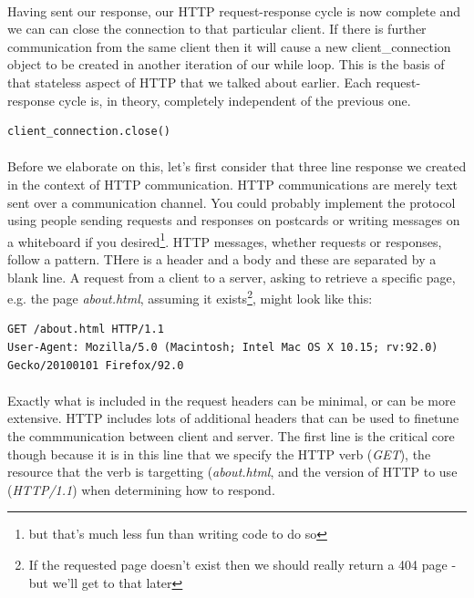 \paragraph{} Having sent our response, our HTTP request-response cycle is now complete and we can can close the connection to that particular client. If there is further communication from the same client then it will cause a new client\_connection object to be created in another iteration of our while loop. This is the basis of that stateless aspect of HTTP that we talked about earlier. Each request-response cycle is, in theory, completely independent of the previous one.

\begin{lstlisting}[style=CODE]
client_connection.close()
\end{lstlisting}


\paragraph{} Before we elaborate on this, let's first consider that three line response we created in the context of HTTP communication. HTTP communications are merely text sent over a communication channel. You could probably implement the protocol using people sending requests and responses on postcards or writing messages on a whiteboard if you desired\footnote{but that's much less fun than writing code to do so}. HTTP messages, whether requests or responses, follow a pattern. THere is a header and a body and these are separated by a blank line. A request from a client to a server, asking to retrieve a specific page, e.g. the page \emph{about.html}, assuming it exists\footnote{If the requested page doesn't exist then we should really return a 404 page - but we'll get to that later}, might look like this:

\begin{lstlisting}[style=DOS]
GET /about.html HTTP/1.1
User-Agent: Mozilla/5.0 (Macintosh; Intel Mac OS X 10.15; rv:92.0) Gecko/20100101 Firefox/92.0

\end{lstlisting}

\paragraph{} Exactly what is included in the request headers can be minimal, or can be more extensive. HTTP includes lots of additional headers that can be used to finetune the commmunication between client and server. The first line is the critical core though because it is in this line that we specify the HTTP verb (\emph{GET}), the resource that the verb is targetting (\emph{about.html}, and the version of HTTP to use (\emph{HTTP/1.1}) when determining how to respond.


